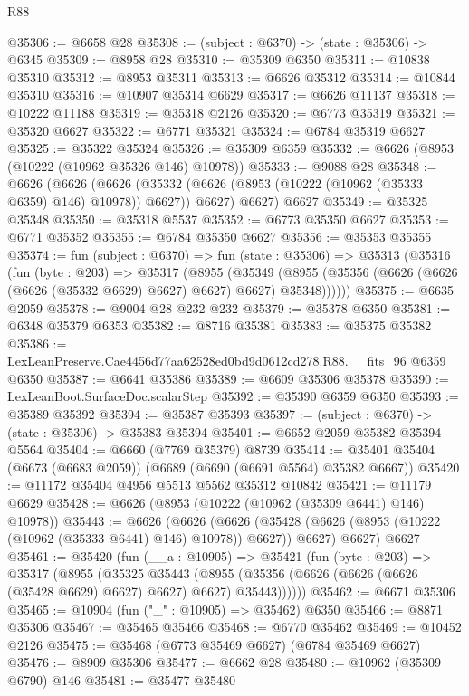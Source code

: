 \begin{lexlean}{R88}
\begin{coremodule}
@35306 := @6658 @28
@35308 := (subject : @6370) -> (state : @35306) -> @6345
@35309 := @8958 @28
@35310 := @35309 @6350
@35311 := @10838 @35310
@35312 := @8953 @35311
@35313 := @6626 @35312
@35314 := @10844 @35310
@35316 := @10907 @35314 @6629
@35317 := @6626 @11137
@35318 := @10222 @11188
@35319 := @35318 @2126
@35320 := @6773 @35319
@35321 := @35320 @6627
@35322 := @6771 @35321
@35324 := @6784 @35319 @6627
@35325 := @35322 @35324
@35326 := @35309 @6359
@35332 := @6626 (@8953 (@10222 (@10962 @35326 @146) @10978))
@35333 := @9088 @28
@35348 := @6626
    (@6626
      (@6626 (@35332 (@6626 (@8953 (@10222 (@10962 (@35333 @6359) @146) @10978)) @6627)) @6627)
      @6627)
    @6627
@35349 := @35325 @35348
@35350 := @35318 @5537
@35352 := @6773 @35350 @6627
@35353 := @6771 @35352
@35355 := @6784 @35350 @6627
@35356 := @35353 @35355
@35374 := fun (subject : @6370) =>
  fun (state : @35306) =>
  @35313
    (@35316
      (fun (byte : @203) =>
      @35317
        (@8955
          (@35349
            (@8955 (@35356 (@6626 (@6626 (@6626 (@35332 @6629) @6627) @6627) @6627) @35348))))))
@35375 := @6635 @2059
@35378 := @9004 @28 @232 @232
@35379 := @35378 @6350
@35381 := @6348 @35379 @6353
@35382 := @8716 @35381
@35383 := @35375 @35382
@35386 := LexLeanPreserve.Cae4456d77aa62528ed0bd9d0612cd278.R88.__fits_96 @6359 @6350
@35387 := @6641 @35386
@35389 := @6609 @35306 @35378
@35390 := LexLeanBoot.SurfaceDoc.scalarStep
@35392 := @35390 @6359 @6350
@35393 := @35389 @35392
@35394 := @35387 @35393
@35397 := (subject : @6370) -> (state : @35306) -> @35383 @35394
@35401 := @6652 @2059 @35382 @35394 @5564
@35404 := @6660 (@7769 @35379) @8739
@35414 := @35401 @35404 (@6673 (@6683 @2059)) (@6689 (@6690 (@6691 @5564) @35382 @6667))
@35420 := @11172 @35404 @4956 @5513 @5562 @35312 @10842
@35421 := @11179 @6629
@35428 := @6626 (@8953 (@10222 (@10962 (@35309 @6441) @146) @10978))
@35443 := @6626
    (@6626
      (@6626 (@35428 (@6626 (@8953 (@10222 (@10962 (@35333 @6441) @146) @10978)) @6627)) @6627)
      @6627)
    @6627
@35461 := @35420
    (fun (__a : @10905) =>
    @35421
      (fun (byte : @203) =>
      @35317
        (@8955
          (@35325
            @35443
            (@8955 (@35356 (@6626 (@6626 (@6626 (@35428 @6629) @6627) @6627) @6627) @35443))))))
@35462 := @6671 @35306
@35465 := @10904 (fun ("_" : @10905) => @35462) @6350
@35466 := @8871 @35306
@35467 := @35465 @35466
@35468 := @6770 @35462
@35469 := @10452 @2126
@35475 := @35468 (@6773 @35469 @6627) (@6784 @35469 @6627)
@35476 := @8909 @35306
@35477 := @6662 @28
@35480 := @10962 (@35309 @6790) @146
@35481 := @35477 @35480

\end{coremodule}
\end{lexlean}
